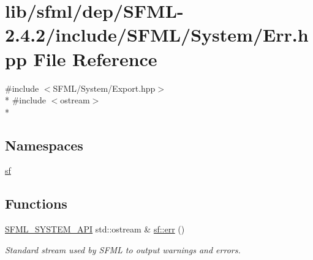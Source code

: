 \hypertarget{sfml_2dep_2_s_f_m_l-2_84_82_2include_2_s_f_m_l_2_system_2_err_8hpp}{\section{lib/sfml/dep/\-S\-F\-M\-L-\/2.4.2/include/\-S\-F\-M\-L/\-System/\-Err.hpp File Reference}
\label{sfml_2dep_2_s_f_m_l-2_84_82_2include_2_s_f_m_l_2_system_2_err_8hpp}
}
{\ttfamily \#include $<$S\-F\-M\-L/\-System/\-Export.\-hpp$>$}\\*
{\ttfamily \#include $<$ostream$>$}\\*
\subsection*{Namespaces}
\begin{DoxyCompactItemize}
\item 
\hyperlink{namespacesf}{sf}
\end{DoxyCompactItemize}
\subsection*{Functions}
\begin{DoxyCompactItemize}
\item 
\hyperlink{sfml_2dep_2_s_f_m_l-2_84_82_2include_2_s_f_m_l_2_system_2_export_8hpp_a6476c9e422606477a4c23d92b1d79a1f}{S\-F\-M\-L\-\_\-\-S\-Y\-S\-T\-E\-M\-\_\-\-A\-P\-I} std\-::ostream \& \hyperlink{group__system_ga7fe7f475639e26334606b5142c29551f}{sf\-::err} ()
\begin{DoxyCompactList}\small\item\em Standard stream used by S\-F\-M\-L to output warnings and errors. \end{DoxyCompactList}\end{DoxyCompactItemize}
